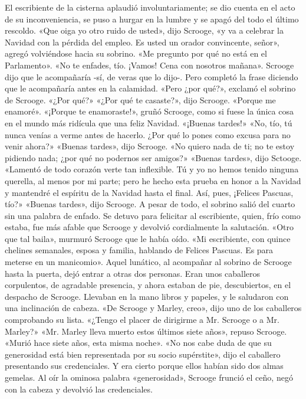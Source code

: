 \documentclass{novela}
\begin{document}
 El escribiente de la cisterna aplaudió involuntariamente; se dio cuenta en el acto de su inconveniencia, se puso a hurgar en la lumbre y se apagó del todo el último rescoldo.
 «Que oiga yo otro ruido de usted», dijo Scrooge, «y va a celebrar la Navidad con la pérdida del empleo. Es usted un orador convincente, señor», agregó volviéndose hacia su sobrino. «Me pregunto por qué no está en el Parlamento».
 «No te enfades, tío. ¡Vamos! Cena con nosotros mañana».
 Scrooge dijo que le acompañaría -sí, de veras que lo dijo-. Pero completó la frase diciendo que le acompañaría antes en la calamidad.
 «Pero ¿por qué?», exclamó el sobrino de Scrooge. «¿Por qué?»
 «¿Por qué te casaste?», dijo Scrooge.
 «Porque me enamoré».
 «¡Porque te enamoraste!», gruñó Scrooge, como si fuese la única cosa en el mundo más ridícula que una feliz Navidad. «¡Buenas tardes!»
 «No, tío, tú nunca venías a verme antes de hacerlo. ¿Por qué lo pones como excusa para no venir ahora?»
 «Buenas tardes», dijo Scrooge.
 «No quiero nada de ti; no te estoy pidiendo nada; ¿por qué no podernos ser amigos?»
 «Buenas tardes», dijo Sctooge.
 «Lamentó de todo corazón verte tan inflexible. Tú y yo no hemos tenido ninguna querella, al menos por mi parte; pero he hecho esta prueba en honor a la Navidad y mantendré el espíritu de la Navidad hasta el final. Así, pues, ¡Felices Pascuas, tío?»
 «Buenas tardes», dijo Scrooge.
 A pesar de todo, el sobrino salió del cuarto sin una palabra de enfado. Se detuvo para felicitar al escribiente, quien, frío como estaba, fue más afable que Scrooge y devolvió cordialmente la salutación.
 «Otro que tal baila», murmuró Scrooge que le había oído. «Mi escribiente, con quince chelines semanales, esposa y familia, hablando de Felices Pascuas. Es para meterse en un manicomio».
 Aquel lunático, al acompañar al sobrino de Scrooge hasta la puerta, dejó entrar a otras dos personas. Eran unos caballeros corpulentos, de agradable presencia, y ahora estaban de pie, descubiertos, en el despacho de Scrooge. Llevaban en la mano libros y papeles, y le saludaron con una inclinación de cabeza.
 «De Scrooge y Marley, creo», dijo uno de los caballeros comprobando su lista. «¿Tengo el placer de dirigirme a Mr. Scrooge o a Mr. Marley?»
 «Mr. Marley lleva muerto estos últimos siete años», repuso Scrooge. «Murió hace siete años, esta misma noche».
 «No nos cabe duda de que su generosidad está bien representada por su socio supérstite», dijo el caballero presentando sus credenciales.
 Y era cierto porque ellos habían sido dos almas gemelas. Al oír la ominosa palabra «generosidad», Scrooge frunció el ceño, negó con la cabeza y devolvió las credenciales.
\end{document}
